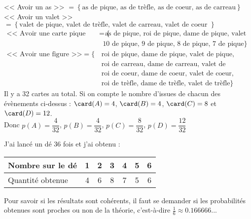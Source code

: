 \documentclass[../Cours.tex]{subfiles}
\begin{document}
\begin{questions}
    \exercice 
    \question << Avoir un as >> $= \left\{ \mbox{as de pique, as de trèfle, as de coeur, as de carreau} \right\}$
    \question << Avoir un valet >> $= \left\{ \mbox{valet de pique, valet de trèfle, valet de carreau, valet de coeur } \right\}$
    \question 
    \begin{align*}
        \mbox{<< Avoir une carte pique >>} = \{ &\mbox{ as de pique, roi de pique, dame de pique, valet de pique, } \\ 
        & \mbox{10 de pique, 9 de pique, 8 de pique, 7 de pique} \}
    \end{align*}
    \question
    \begin{align*}
        \mbox{<< Avoir une figure >>} = \{ &\mbox{ roi de pique, dame de pique, valet de pique, }\\ 
        &\mbox{ roi de carreau, dame de carreau, valet de carreau,}\\
        &\mbox{ roi de coeur, dame de coeur, valet de coeur,} \\ 
        &\mbox{ roi de trèfle, dame de trèfle, valet de trèfle} \}
    \end{align*}
    \question Il y a 32 cartes au total. Si on compte le nombre d'issues de chacun des évènements ci-dessus : $\card(A) = 4$, $\card(B)=4$, $\card(C)=8$ et $\card(D)=12$.\\[2ex]
    Donc $p(A)=\dfrac{4}{32}$, $p(B)=\dfrac{4}{32}$, $p(C)=\dfrac{8}{32}$, $p(D)=\dfrac{12}{32}$

    \clearpage
    \exercice 
    \question 
    \begin{center}
    \end{center}
    \question J'ai lancé un dé 36 fois et j'ai obtenu :
    \begin{center}
        \begin{tabularx}{0.6\linewidth}{|l|C|C|C|C|C|C|}\hline
            Nombre sur le dé & 1 & 2 & 3 & 4 & 5 & 6 \\\hline
            Quantité obtenue & 4 & 6 & 8 & 7 & 5 & 6 \\\hline
        \end{tabularx}
    \end{center}

    Pour savoir si les résultats sont cohérents, il faut se demander si les probabilités obtenues sont proches ou non de la théorie, c'est-à-dire $\frac{1}{6} \approx \num{0.166666}...$
    
\end{questions}
\end{document}
